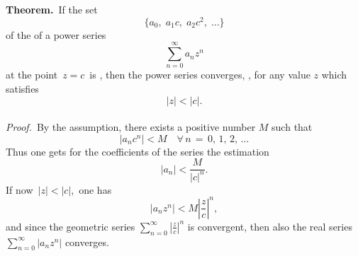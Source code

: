 \documentclass[12pt]{article}
\theoremstyle{definition}
\begin{document}
\textbf{Theorem.}\, If the set
$$\{a_0,\;a_1c,\; a_2c^2,\;\ldots\}$$
of the  of a power series 
$$\sum_{n=0}^\infty a_nz^n$$
at the point \,$z = c$\, is , then the power series converges,  , for any value $z$ which satisfies
$$|z| < |c|.$$\\

\emph{Proof.}\, By the assumption, there exists a positive number $M$ such that
$$|a_nc^n| < M \quad \forall\, n \,=\, 0,\,1,\,2,\,\ldots$$
Thus one gets for the coefficients of the series the estimation
$$|a_n| < \frac{M}{|c|^n}.$$
If now\, $|z| < |c|$,\, one has
$$|a_nz^n| < M\left|\frac{z}{c}\right|^n,$$
and since the geometric series $\displaystyle\sum_{n=0}^\infty\left|\frac{z}{c}\right|^n$ is convergent, then also the real series $\displaystyle\sum_{n=0}^\infty|a_nz^n|$ converges.
\end{document}

